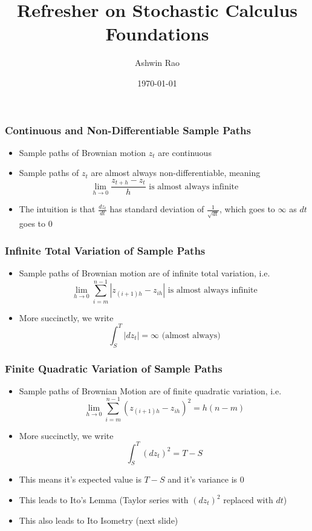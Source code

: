 \documentclass{beamer}
\title[Stochastic Calculus Foundations]{Refresher on Stochastic Calculus Foundations} %
\author{Ashwin Rao} %
\institute[Stanford] %
{
ICME, Stanford University
}
\date{\today} %
\begin{document}
\begin{frame}
\titlepage %
\end{frame}

\begin{frame}
\frametitle{Continuous and Non-Differentiable Sample Paths}
\begin{itemize}
\item Sample paths of Brownian motion $z_t$ are continuous
\item Sample paths of $z_t$ are almost always non-differentiable, meaning
$$\lim_{h \rightarrow 0} \frac {z_{t+h} - z_t} {h} \mbox{ is almost always infinite}$$
\item The intuition is that $\frac {dz_t} {dt}$ has standard deviation of $\frac 1 {\sqrt{dt}}$, which goes to $\infty$ as $dt$ goes to 0
\end{itemize}
\end{frame}

\begin{frame}
\frametitle{Infinite Total Variation of Sample Paths}
\begin{itemize}
\item Sample paths of Brownian motion are of infinite total variation, i.e.
$$\lim_{h \rightarrow 0} \sum_{i=m}^{n-1} |z_{(i+1)h} - z_{ih}| \mbox{ is almost always infinite}$$
\item More succinctly, we write
$$\int_S^T |dz_t| = \infty \mbox{ (almost always)}$$
\end{itemize}
\end{frame}

\begin{frame}
\frametitle{Finite Quadratic Variation of Sample Paths}
\begin{itemize}
\item Sample paths of Brownian Motion are of finite quadratic variation, i.e.
$$\lim_{h \rightarrow 0} \sum_{i=m}^{n-1} (z_{(i+1)h} - z_{ih})^2 = h(n-m)$$ 
\item More succinctly, we write
$$\int_S^T (dz_t)^2= T-S$$
\item This means it's expected value is $T-S$ and it's variance is 0
\item This leads to Ito's Lemma (Taylor series with $(dz_t)^2$ replaced with $dt$)
\item This also leads to Ito Isometry (next slide)
\end{itemize}
\end{frame}
\end{document}

